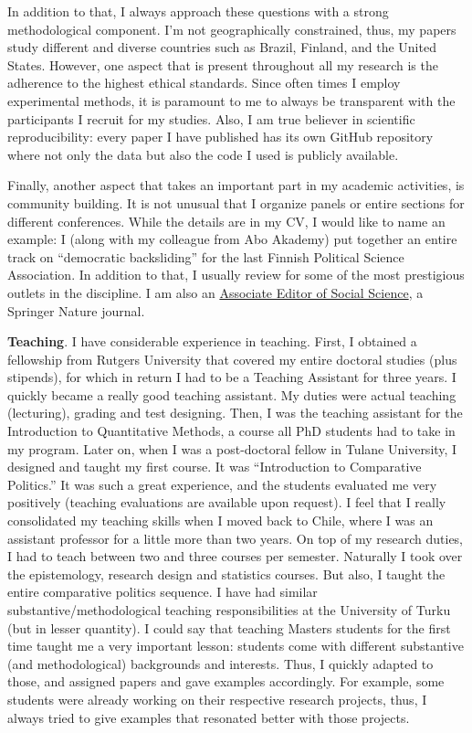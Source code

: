 \documentclass[10pt,stdletter,dateno,sigleft]{newlfm} %
\begin{document}
\begin{newlfm}
In addition to that, I always approach these questions with a strong methodological component. I'm not geographically constrained, thus, my papers study different and diverse countries such as Brazil, Finland, and the United States. However, one aspect that is present throughout all my research is the adherence to the highest ethical standards. Since often times I employ experimental methods, it is paramount to me to always be transparent with the participants I recruit for my studies. Also, I am true believer in scientific reproducibility: every paper I have published has its own GitHub repository where not only the data but also the code I used is publicly available. 

Finally, another aspect that takes an important part in my academic activities, is community building. It is not unusual that I organize panels or entire sections for different conferences. While the details are in my CV, I would like to name an example: I (along with my colleague from Abo Akademy) put together an entire track on ``democratic backsliding'' for the last Finnish Political Science Association. In addition to that, I usually review for some of the most prestigious outlets in the discipline. I am also an \href{https://www.springer.com/journal/43545/editors}{Associate Editor of Social Science}, a Springer Nature journal.

{\bf Teaching}. I have considerable experience in teaching. First, I obtained a fellowship from Rutgers University that covered my entire doctoral studies (plus stipends), for which in return I had to be a Teaching Assistant for three years. I quickly became a really good teaching assistant. My duties were actual teaching (lecturing), grading and test designing. Then, I was the teaching assistant for the Introduction to Quantitative Methods, a course all PhD students had to take in my program. Later on, when I was a post-doctoral fellow in Tulane University, I designed and taught my first course. It was ``Introduction to Comparative Politics.'' It was such a great experience, and the students evaluated me very positively (teaching evaluations are available upon request). I feel that I really consolidated my teaching skills when I moved back to Chile, where I was an assistant professor for a little more than two years. On top of my research duties, I had to teach between two and three courses per semester. Naturally I took over the epistemology, research design and statistics courses. But also, I taught the entire comparative politics sequence. I have had similar substantive/methodological teaching responsibilities at the University of Turku (but in lesser quantity). I could say that teaching Masters students for the first time taught me a very important lesson: students come with different substantive (and methodological) backgrounds and interests. Thus, I quickly adapted to those, and assigned papers and gave examples accordingly. For example, some students were already working on their respective research projects, thus, I always tried to give examples that resonated better with those projects.


\end{newlfm}
\end{document}
